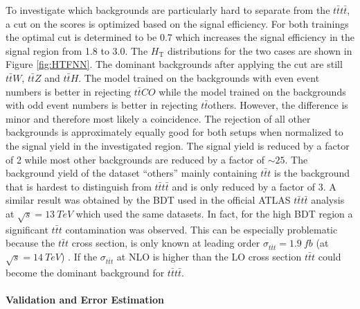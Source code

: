 To investigate which backgrounds are particularly hard to separate from the $t\bar{t}t\bar{t}$, a cut on the scores is optimized based on the signal efficiency. For both trainings the optimal cut is determined to be 0.7 which increases the signal efficiency in the signal region from 1.8 to 3.0. The $H_{\text{T}}$ distributions for the two cases are shown in Figure \ref{fig:HTFNN}. The dominant backgrounds after applying the cut are still $t\bar{t}W$, $t\bar{t}Z$ and $t\bar{t}H$. The model trained on the backgrounds with even event numbers is better in rejecting $t\bar{t}CO$ while the model trained on the backgrounds with odd event numbers is better in rejecting $t\bar{t}$others. However, the difference is minor and therefore most likely a coincidence. The rejection of all other backgrounds is approximately equally good for both setups when normalized to the signal yield in the investigated region. The signal yield is reduced by a factor of 2 while most other backgrounds are reduced by a factor of $\sim 25$. The background  yield of the dataset ``others'' mainly containing $t\bar{t}t$ is the background that is hardest to distinguish from $t\bar{t}t\bar{t}$ and is only reduced by a factor of 3. A similar result was obtained by the BDT used in the official ATLAS $t\bar{t}t\bar{t}$ analysis at $\sqrt{s} = \SI{13}{TeV}$ which used the same datasets. In fact, for the high BDT region a significant $t\bar{t}t$ contamination was observed. This can be especially problematic because the $t\bar{t}t$ cross section, is only known at leading order $\sigma_{t\bar{t}t} = \SI{1.9}{fb}$ (at $\sqrt{s} = \SI{14}{TeV}$) \cite{3t}. If the  $\sigma_{t\bar{t}t}$ at NLO is higher than the LO cross section $t\bar{t}t$ could become the dominant background for $t\bar{t}t\bar{t}$. \\

\paragraph{Validation and Error Estimation} \mbox{} \\

